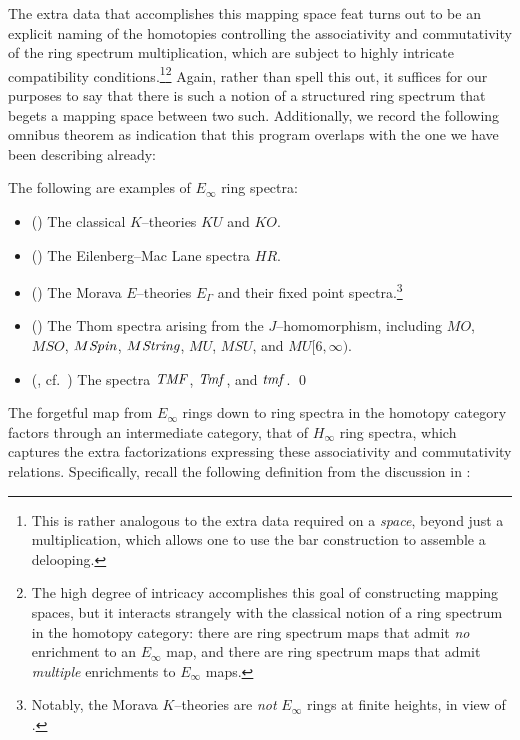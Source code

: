 The extra data that accomplishes this mapping space feat turns out to be an explicit naming of the homotopies controlling the associativity and commutativity of the ring spectrum multiplication, which are subject to highly intricate compatibility conditions.\footnote{This is rather analogous to the extra data required on a \emph{space}, beyond just a multiplication, which allows one to use the bar construction to assemble a delooping.}\footnote{The high degree of intricacy accomplishes this goal of constructing mapping spaces, but it interacts strangely with the classical notion of a ring spectrum in the homotopy category: there are ring spectrum maps that admit \emph{no} enrichment to an $E_\infty$ map, and there are ring spectrum maps that admit \emph{multiple} enrichments to $E_\infty$ maps.}  Again, rather than spell this out, it suffices for our purposes to say that there is such a notion of a structured ring spectrum that begets a mapping space between two such.  Additionally, we record the following omnibus theorem as indication that this program overlaps with the one we have been describing already:
\begin{theorem}
The following are examples of $E_\infty$ ring spectra:
\begin{itemize}
    \item (\cite[Section VIII.1]{MayRingSpacesSpectra}) The classical $K$--theories $KU$ and $KO$.
    \item (\cite[Section VIII.1]{MayRingSpacesSpectra}) The Eilenberg--Mac Lane spectra $HR$.
    \item (\cite[Corollary 7.6--7]{GoerssHopkins}) The Morava $E$--theories $E_\Gamma$ and their fixed point spectra.\footnote{Notably, the Morava $K$--theories are \emph{not} $E_\infty$ rings at finite heights, in view of .}
    \item (\cite[Section IV.3]{MayRingSpacesSpectra}) The Thom spectra arising from the $J$--homomorphism, including $MO$, $MSO$, $M\mathit{Spin}$, $M\mathit{String}$, $MU$, $MSU$, and $MU[6, \infty)$.
    \item (\cite{BehrensConstruction}, cf.\ ) The spectra $\mathit{TMF}$, $\mathit{Tmf}$, and $\mathit{tmf}$. \qed
\end{itemize}
\end{theorem}

The forgetful map from $E_\infty$ rings down to ring spectra in the homotopy category factors through an intermediate category, that of $H_\infty$ ring spectra, which captures the extra factorizations expressing these associativity and commutativity relations.  Specifically, recall the following definition from the discussion in :

